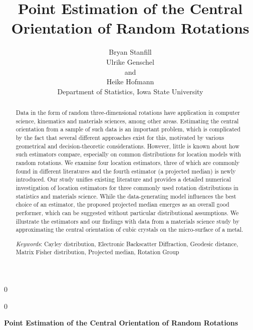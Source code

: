 \documentclass[12pt]{article}
\newcommand{\blind}{0}
\begin{document}
\def\spacingset#1{\renewcommand{\baselinestretch}%
{#1}\small\normalsize} \spacingset{1}

\blind
{
  \title{\bf Point Estimation of the Central Orientation of Random Rotations}
  \author{Bryan Stanfill\\
    Ulrike Genschel \\
    and\\
    Heike Hofmann\\
    Department of Statistics, Iowa State University\\}
  \maketitle
} \fi

\blind
{
  \bigskip
  \bigskip
  \bigskip
  \begin{center}
    {\LARGE\bf Point Estimation of the Central Orientation of Random Rotations}
\end{center}
  \medskip
} \fi



\bigskip
\begin{abstract}
Data in the form of random three-dimensional rotations have application in computer science, kinematics and materials sciences, among other areas.  Estimating the central orientation from a sample of such data is an important problem, which is complicated by the
fact that several different approaches exist for this,  motivated by various geometrical and decision-theoretic considerations. However, little is known about how such estimators compare, especially on common distributions for location models with random rotations.  We examine four location estimators, three of which are commonly found in different literatures and the
fourth estimator (a projected median) is newly introduced.  Our study unifies
existing literature and provides a detailed numerical investigation of location estimators for three commonly used rotation distributions in statistics and materials science.  While
the data-generating model influences the best choice of an estimator, the proposed projected median emerges as an overall good performer, which can be suggested
without particular distributional assumptions.  We illustrate the estimators 
and our findings with data from a materials science study by approximating the central orientation of cubic crystals on the micro-surface of a metal.



\noindent\textit{Keywords}: Cayley distribution, Electronic Backscatter Diffraction, Geodesic distance, Matrix Fisher distribution, Projected median,  Rotation Group \end{abstract}
\spacingset{1.45} %
\newpage







\clearpage

\clearpage

\end{document}
